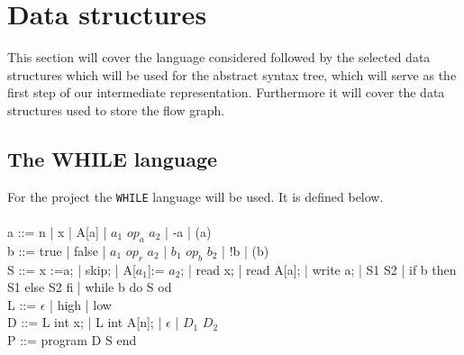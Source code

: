 \chapter{Data structures}
This section will cover the language considered followed by the selected data structures which will be used for the abstract syntax tree, which will serve as the first step of our intermediate representation. Furthermore it will cover the data structures used to store the flow graph.

\section{The WHILE language}
For the project the \texttt{WHILE} language will be used. It is defined below.
\\\\
a ::= n | x | A[a] | $a_1$ $op_a$ $a_2$ | -a | (a)\\
b ::= true | false | $a_1$ $op_r$ $a_2$ | $b_1$ $op_b$ $b_2$ | !b | (b)\\
S ::= x :=a; | skip; | A[$a_1$]:= $a_2$; | read x; | read A[a]; | write a; | S1 S2 | if b then S1 else S2 fi | while b do S od\\
L ::= $\epsilon$ | high | low\\
D ::= L int x; | L int A[n]; | $\epsilon$ | $D_1$ $D_2$\\
P ::= program D S end\\

